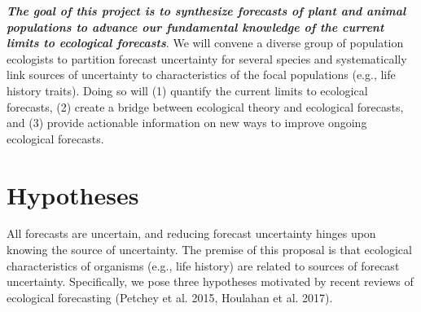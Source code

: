 \documentclass[12pt,]{article}
\begin{document}
\textbf{\emph{The goal of this project is to synthesize forecasts of plant and animal populations to advance our fundamental knowledge of the current limits to ecological forecasts}}.
We will convene a diverse group of population ecologists to partition
forecast uncertainty for several species and systematically link sources
of uncertainty to characteristics of the focal populations (e.g., life
history traits). Doing so will (1) quantify the current limits to
ecological forecasts, (2) create a bridge between ecological theory and
ecological forecasts, and (3) provide actionable information on new ways
to improve ongoing ecological forecasts.

\section{Hypotheses}

All forecasts are uncertain, and reducing forecast uncertainty hinges
upon knowing the source of uncertainty. The premise of this proposal is
that ecological characteristics of organisms (e.g., life history) are
related to sources of forecast uncertainty. Specifically, we pose three
hypotheses motivated by recent reviews of ecological forecasting
(Petchey et al. 2015, Houlahan et al. 2017).
\end{document}
